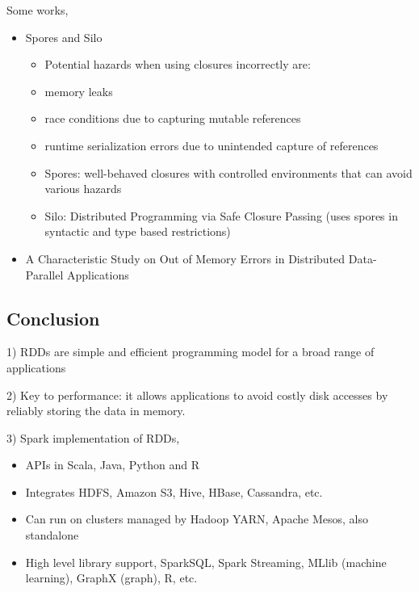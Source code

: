 \begin{frame}
Some works,
\begin{itemize}
  \item Spores and Silo
  	\begin{itemize}
  	  \item Potential hazards when using closures incorrectly are: 
  	  \item memory leaks
  	  \item race conditions due to capturing mutable references
  	  \item runtime serialization errors due to unintended capture of references
  	  \item Spores: well-behaved closures with controlled environments that can
  	  avoid various hazards
  	  \item Silo: Distributed Programming via Safe Closure Passing (uses spores
  	  in syntactic and type based restrictions)
  	\end{itemize}
  \item A Characteristic Study on Out of Memory Errors in Distributed
  Data-Parallel Applications
\end{itemize}
\end{frame}

\subsection{Conclusion}
\begin{frame}
1) RDDs are simple and efficient programming model for a broad range of
applications

2) Key to performance: it allows applications to avoid costly
disk accesses by reliably storing the data in memory.

3) Spark implementation of RDDs,
\begin{itemize}
  \item APIs in Scala, Java, Python and R
  \item Integrates HDFS, Amazon S3, Hive, HBase, Cassandra, etc.
  \item Can run on clusters managed by Hadoop YARN, Apache Mesos, also
  standalone 
  \item High level library support, SparkSQL, Spark Streaming, MLlib (machine
  learning), GraphX (graph), R, etc.
\end{itemize}
\end{frame}

